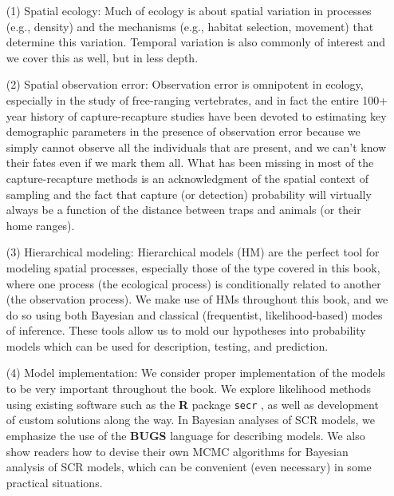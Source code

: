 \begin{itemize}
\item[(1)]  Spatial ecology: Much of ecology is about spatial variation in
  processes (e.g., density) and the mechanisms (e.g., habitat selection, movement) that
  determine this variation. Temporal variation is also commonly of interest and
  we cover this as well, but in less depth.

\item[(2)] Spatial observation error: Observation error is omnipotent in
  ecology, especially in the study of free-ranging vertebrates, and in
  fact the entire 100+ year history of capture-recapture studies have
  been devoted to estimating key demographic parameters in the
  presence of observation error because we simply cannot observe all
  the individuals that are present,
  and we can't know
  their fates even if we mark them all. What has been missing in most
  of the capture-recapture methods is an acknowledgment of the
  spatial context of sampling and the fact that capture (or detection)
  probability will virtually always be a function of the distance
  between traps and animals (or their home ranges).

\item[(3)] Hierarchical modeling: Hierarchical models (HM) are the
  perfect tool for modeling spatial processes, especially those of the
  type covered in this book, where one process (the ecological
  process) is conditionally related to another (the observation
  process). We make use of HMs throughout this book, and we do so
  using both Bayesian and classical (frequentist, likelihood-based)
  modes of inference. These tools allow us to mold our hypotheses into
  probability models which can be used for description, testing, and
  prediction.

\item[(4)] Model implementation: We consider proper implementation of
  the models to be very important throughout the book.  We explore
  likelihood methods using existing software such as the {\bf R}
  package \mbox{\tt secr} \citep{efford:2011}, as well as development
  of custom solutions along the way. In Bayesian analyses of SCR
  models, we emphasize the use of the {\bf BUGS} language for
  describing models.  We also show readers how to devise their own
  MCMC algorithms for Bayesian analysis of SCR models, which can be
  convenient (even necessary) in some practical situations.

\end{itemize}

